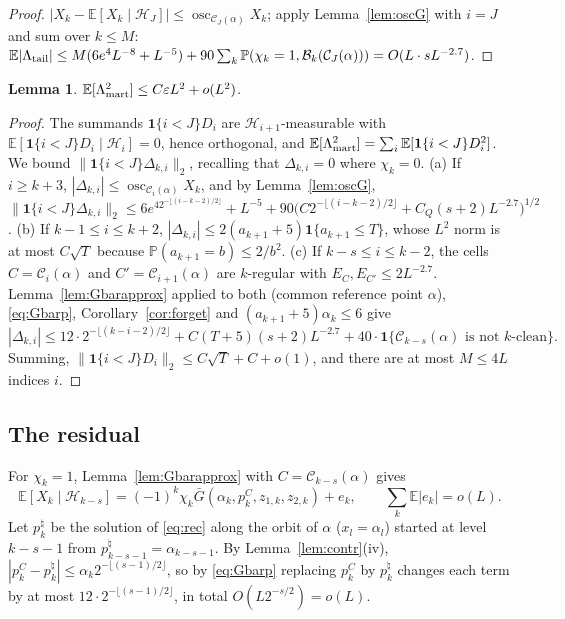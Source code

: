 \documentclass[11pt]{amsart}
\newtheorem{lemma}[theorem]{Lemma}
\theoremstyle{definition}
\numberwithin{equation}{section}
\newcommand{\E}{\mathbb{E}}
\newcommand{\Prob}{\mathbb{P}}
\newcommand{\cH}{\mathcal{H}}
\newcommand{\cC}{\mathcal{C}}
\newcommand{\cB}{\mathcal{B}}
\newcommand{\eps}{\varepsilon}
\newcommand{\ind}{\mathbf{1}}
\DeclareMathOperator{\osc}{osc}
\begin{document}
\begin{proof}
$|X_k-\E[X_k\mid\cH_J]|\le\osc_{\cC_J(\alpha)}X_k$; apply Lemma~\ref{lem:oscG} with $i=J$ and sum over $k\le M$:
$\E|\Lambda_{\rm tail}|\le M(6e^4L^{-8}+L^{-5})+90\sum_k\Prob(\chi_k=1,\cB_k(\cC_J(\alpha)))=O(L\cdot sL^{-2.7})$.
\end{proof}

\begin{lemma}\label{lem:mart}
$\E[\Lambda_{\rm mart}^2]\le C\eps L^2+o(L^2)$.
\end{lemma}

\begin{proof}
The summands $\ind\{i<J\}D_i$ are $\cH_{i+1}$-measurable with $\E[\ind\{i<J\}D_i\mid\cH_i]=0$, hence orthogonal, and
$\E[\Lambda_{\rm mart}^2]=\sum_i\E[\ind\{i<J\}D_i^2]$. We bound $\|\ind\{i<J\}\Delta_{k,i}\|_2$, recalling that $\Delta_{k,i}=0$ where $\chi_k=0$.
(a) If $i\ge k+3$, $|\Delta_{k,i}|\le\osc_{\cC_i(\alpha)}X_k$, and by Lemma~\ref{lem:oscG},
$\|\ind\{i<J\}\Delta_{k,i}\|_2\le6e^42^{-\lfloor(i-k-2)/2\rfloor}+L^{-5}+90\big(C2^{-\lfloor(i-k-2)/2\rfloor}+C_Q(s+2)L^{-2.7}\big)^{1/2}$.
(b) If $k-1\le i\le k+2$, $|\Delta_{k,i}|\le2(a_{k+1}+5)\ind\{a_{k+1}\le T\}$, whose $L^2$ norm is at most $C\sqrt T$ because $\Prob(a_{k+1}=b)\le2/b^2$.
(c) If $k-s\le i\le k-2$, the cells $C=\cC_i(\alpha)$ and $C'=\cC_{i+1}(\alpha)$ are $k$-regular with $E_C,E_{C'}\le2L^{-2.7}$. Lemma~\ref{lem:Gbarapprox}
applied to both (common reference point $\alpha$), \eqref{eq:Gbarp}, Corollary~\ref{cor:forget} and $(a_{k+1}+5)\alpha_k\le6$ give
\[
|\Delta_{k,i}|\le12\cdot2^{-\lfloor(k-i-2)/2\rfloor}+C(T+5)(s+2)L^{-2.7}+40\cdot\ind\{\cC_{k-s}(\alpha)\text{ is not $k$-clean}\}.
\]
Summing, $\|\ind\{i<J\}D_i\|_2\le C\sqrt T+C+o(1)$, and there are at most $M\le4L$ indices $i$.
\end{proof}

\subsection{The residual}
For $\chi_k=1$, Lemma~\ref{lem:Gbarapprox} with $C=\cC_{k-s}(\alpha)$ gives
\[
\E[X_k\mid\cH_{k-s}]=(-1)^k\chi_k\bar G(\alpha_k,p^C_k,z_{1,k},z_{2,k})+e_k,\qquad \textstyle\sum_k\E|e_k|=o(L).
\] Let $p^\natural_k$ be the solution of \eqref{eq:rec}
along the orbit of $\alpha$ ($x_l=\alpha_l$) started at level $k-s-1$ from $p^\natural_{k-s-1}=\alpha_{k-s-1}$. By Lemma~\ref{lem:contr}(iv),
$|p^C_k-p^\natural_k|\le\alpha_k2^{-\lfloor(s-1)/2\rfloor}$, so by \eqref{eq:Gbarp} replacing $p^C_k$ by $p^\natural_k$ changes each term by at most
$12\cdot2^{-\lfloor(s-1)/2\rfloor}$, in total $O(L2^{-s/2})=o(L)$.
\end{document}
